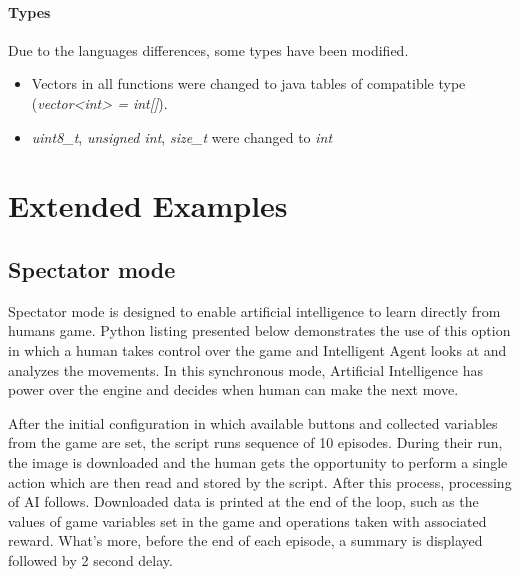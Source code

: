 \paragraph {Types}
Due to the languages differences, some types have been modified.
\begin{itemize}
\item Vectors in all functions were changed to java tables of compatible type (\emph{vector<int> = int[]}).
\item \emph{uint8\_t}, \emph{unsigned int}, \emph{size\_t} were changed to \emph{int}
\end{itemize}
\section{Extended Examples}
\subsection{Spectator mode}
	Spectator mode is designed to enable artificial intelligence to learn directly from humans game.
Python listing presented below demonstrates the use of this option in which a human takes control over the game and Intelligent Agent looks at and analyzes the movements. In this synchronous mode, Artificial Intelligence has power over the engine and decides when human can make the next move. 


After the initial configuration in which available buttons and collected variables from the game are set, the script runs sequence of 10 episodes. During their run, the image is downloaded and the human gets the opportunity to perform a single action which are then read and stored by the script. After this process, processing of AI follows. Downloaded data is printed at the end of the loop, such as the values of game variables set in the game and operations taken with associated reward. What's more, before the end of each episode, a summary is displayed followed by 2 second delay.

